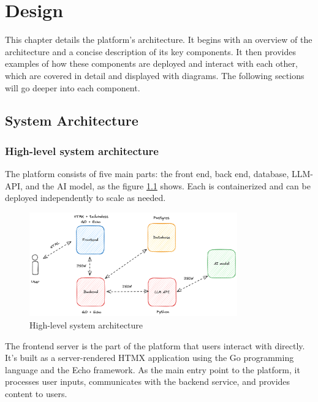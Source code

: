 \chapter{Design}

This chapter details the platform's architecture. It begins with an overview of the architecture and a concise description of its key components. It then provides examples of how these components are deployed and interact with each other, which are covered in detail and displayed with diagrams. The following sections will go deeper into each component.

\section{System Architecture}

\subsection{High-level system architecture}

The platform consists of five main parts: the front end, back end, database, LLM-API, and the AI model, as the figure \ref{fig:high-level-architecture} shows. Each is containerized and can be deployed independently to scale as needed.

\begin{figure}[!h]
    \centering
    \includegraphics[width=0.8\textwidth, keepaspectratio]{figures/high-level-architecture.png}
    \caption{High-level system architecture}
    \label{fig:high-level-architecture}
\end{figure}

The frontend server is the part of the platform that users interact with directly. It's built as a server-rendered HTMX application using the Go programming language and the Echo framework. As the main entry point to the platform, it processes user inputs, communicates with the backend service, and provides content to users.

